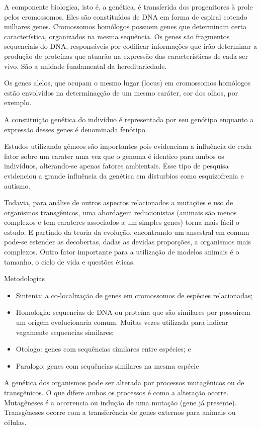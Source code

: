 \documentclass[
	article,			%
	12pt,				%
	oneside,			%
	a4paper,			%
	english,			%
	brazil,				%
	sumario=tradicional
	]{abntex2}
\begin{document}
A componente biologica, isto é, a genética, é transferida dos progenitores à prole pelos cromossomos.
Eles são constituídos de DNA em forma de espiral cotendo milhares genes.
Cromossomos homólogos possuem genes que determinam certa característica, organizados na mesma sequência. Os genes são  fragmentos sequenciais do DNA, responsáveis por codificar informações que irão determinar a produção de proteínas que atuarão na expressão das características de cada ser vivo. São a unidade fundamental da hereditariedade.

Os genes alelos, que ocupam o mesmo lugar (locus) em cromossomos homólogos estão envolvidos na determinaçção de um mesmo caráter, cor dos olhos, por exemplo.

A constituição genética do indivíduo é representada por seu genótipo enquanto a expressão desses genes é denominada fenótipo.




Estudos utilizando gêmeos são importantes pois evidenciam a influência de cada fator sobre um carater uma vez que o genoma é identico para ambos os indivíduos, alterando-se apenas fatores ambientais. Esse tipo de pesquisa evidenciou a grande influência da genética em disturbios como esquizofrenia e autismo.

Todavia, para análise de outros aspectos relacionados a mutações e uso de organismos transgênicos, uma abordagem reducionistas (animais são menos complexos e tem carateres associados a um simples genes) torna mais fácil o estudo. E partindo da teoria da evolução, encontrando um ansestral em comum pode-se estender as decobertas, dadas as devidas proporções, a organismos mais complexos. Outro fator importante para a utilização de modelos animais é o tamanho, o ciclo de vida e questões éticas.

Metodologias
\begin{itemize}
\item Sintenia:	a	co-localização	de	genes	em	 cromossomos	de	espécies relacionadas;
\item Homologia:	sequencias	de	DNA	ou proteína	que	são similares	por	 possuirem	um	origem	evolucionaria	 comum.	Muitas	vezes	utilizada para	indicar	vagamente sequencias similares;
\item Otologo:	genes	com	sequências	 similares	entre espécies; e
\item Paralogo: genes	com	sequências	 similares	na	mesma espécie
\end{itemize}
	

A genética dos organismos pode ser alterada por processos mutagênicos ou de transgênicos. O que difere ambos os processos é como a alteração ocorre. Mutagêneses é a ocorrencia ou indução de uma mutação (gene já presente). Transgêneses ocorre com a transferência de genes externos para animais ou células.
\end{document}
